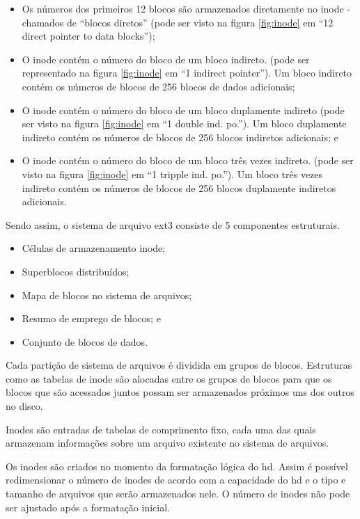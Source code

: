 \begin{itemize}
	\item Os números dos primeiros 12 blocos são armazenados diretamente no inode - chamados de ``blocos diretos'' (pode ser visto na figura \ref{fig:inode} em ``12 direct pointer to data blocks'');
	\item O inode contém o número do bloco de um bloco indireto. (pode ser representado na figura \ref{fig:inode} em ``1 indirect pointer''). Um bloco indireto contém os números de blocos de 256 blocos de dados adicionais;
	\item O inode contém o número do bloco de um bloco duplamente indireto (pode ser visto na figura \ref{fig:inode} em ``1 double ind. po.''). Um bloco duplamente indireto contém os números de blocos de 256 blocos indiretos adicionais; e
	\item O inode contém o número do bloco de um bloco três vezes indireto. (pode ser visto na figura \ref{fig:inode} em ``1 tripple ind. po.''). Um bloco três vezes indireto contém os números de blocos de 256 blocos duplamente indiretos adicionais.
\end{itemize}

Sendo assim, o sistema de arquivo ext3 consiste de 5 componentes estruturais.

\begin{itemize}
	\item Células de armazenamento inode;
	\item Superblocos distribuídos;
	\item Mapa de blocos no sistema de arquivos;
	\item Resumo de emprego de blocos; e
	\item Conjunto de blocos de dados.
\end{itemize}

Cada partição de sistema de arquivos é dividida em grupos de blocos. Estruturas como as tabelas de inode são alocadas entre os grupos de blocos para que os blocos que são acessados juntos possam ser armazenados próximos uns dos outros no disco.

Inodes são entradas de tabelas de comprimento fixo, cada uma das quais armazenam informações sobre um arquivo existente no sistema de arquivos.

Os inodes são criados no momento da formatação lógica do hd. Assim é possível redimensionar o número de inodes de acordo com a capacidade do hd e o tipo e tamanho de arquivos que serão armazenados nele. O número de inodes não pode ser ajustado após a formatação inicial.

